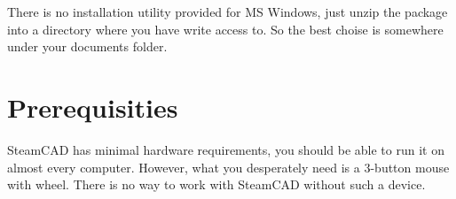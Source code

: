 There is no installation utility provided for MS Windows, just unzip the package into a directory
where you have write access to. So the best choise is somewhere under your documents folder.

\section{Prerequisities}

SteamCAD has minimal hardware requirements, you should be able to run it on almost every
computer. However, what you desperately need is a 3-button mouse with wheel. There is no way
to work with SteamCAD without such a device.

